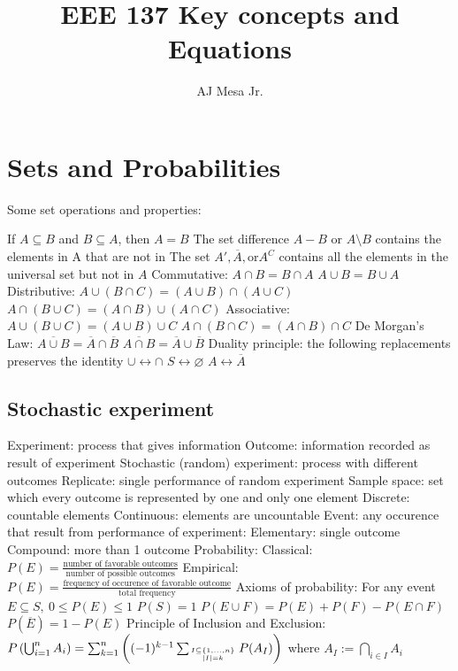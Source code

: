 \documentclass[a4paper,11pt]{article}
\title{\textbf{EEE 137 Key concepts and Equations}}
\author{AJ Mesa Jr.}
\begin{document}
	\maketitle
	\tableofcontents
	
	\section{Sets and Probabilities}
	Some set operations and properties:
	\begin{outline}[enumerate]
		\1 If $A \subseteq B$ and $B \subseteq A$, then $A = B$
		\1 The set difference $A - B$ or $A \setminus B$ contains the elements in A that are not in 
		\1 The set $A', \overline{A}, \text{or} A^C$ contains all the elements in the universal set but not in $A$ 
		\1 Commutative: 
			\2 $A \cap B = B \cap A$ 
			\2 $A \cup B = B \cup A$
		\1 Distributive: 
			\2 $A \cup \left(B \cap C\right) = \left(A \cup B\right)\cap \left(A \cup C\right)$
			\2 $A \cap \left(B \cup C\right) = \left(A \cap B\right)\cup \left(A \cap C\right)$
		\1 Associative: 
			\2 $A \cup \left(B \cup C\right) 	= \left(A \cup B\right) \cup C$
			\2 $A \cap \left(B \cap C\right) 	= \left(A \cap B\right) \cap C$
		\1 De Morgan's Law:
			\2 $\overline{A \cup B} = \overline{A} \cap \overline{B}$
			\2 $\overline{A \cap B} = \overline{A} \cup \overline{B}$	
		\1 Duality principle: the following replacements preserves the identity 
			\2 $\cup \longleftrightarrow \cap$
			\2 $S \longleftrightarrow \varnothing$	
			\2 $A \longleftrightarrow \overline{A}$
	\end{outline}
	\subsection*{Stochastic experiment}
	\begin{outline}[enumerate]
		\1 Experiment: process that gives information
		\1 Outcome: information recorded as result of experiment
		\1 Stochastic (random) experiment: process with different outcomes
		\1 Replicate: single performance of random experiment
		\1 Sample space: set which every outcome is represented by one and only one element
			\2 Discrete: countable elements
			\2 Continuous: elements are uncountable
		\1 Event: any occurence that result from performance of experiment:
			\2 Elementary: single outcome
			\2 Compound: more than 1 outcome
		\1 Probability: 
			\2 Classical: $P(E) = \frac{\text{number of favorable outcomes}}{\text{number of possible outcomes}}$
			\2 Empirical: $P(E) = \frac{\text{frequency of occurence of favorable outcome}}{\text{total frequency}}$	
		\1 Axioms of probability:
			\2 For any event $E \subseteq S,~0 \leq P(E) \leq 1$
			\2 $P(S) = 1$
			\2 $P(E \cup F) = P(E) + P(F) - P(E \cap F)$
			\2 $P(\overline{E}) = 1 - P(E)$
			\2 Principle of Inclusion and Exclusion: $P\left(\bigcup _{i=1}^{n}A_{i}\right)=\sum _{k=1}^{n}\left((-1)^{k-1}\sum _{I\subseteq \{1,\ldots ,n\} \atop |I|=k} P (A_{I})\right)$	
			\2 where $A_{I}:=\bigcap _{{i\in I}}A_{i}$
	\end{outline}
\end{document}
